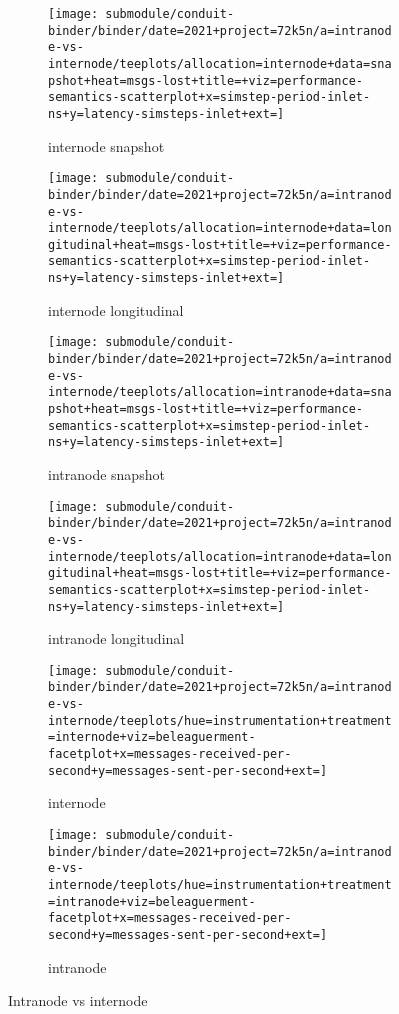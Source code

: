 \begin{figure*}[h]
    \centering
    \begin{subfigure}[b]{0.45\textwidth}
        \centering
        \texttt{[image: submodule/conduit-binder/binder/date=2021+project=72k5n/a=intranode-vs-internode/teeplots/allocation=internode+data=snapshot+heat=msgs-lost+title=+viz=performance-semantics-scatterplot+x=simstep-period-inlet-ns+y=latency-simsteps-inlet+ext=]}
        \caption{internode snapshot}
        \label{fig:TODO}
      \end{subfigure}%
      \begin{subfigure}[b]{0.45\textwidth}
      \centering
      \texttt{[image: submodule/conduit-binder/binder/date=2021+project=72k5n/a=intranode-vs-internode/teeplots/allocation=internode+data=longitudinal+heat=msgs-lost+title=+viz=performance-semantics-scatterplot+x=simstep-period-inlet-ns+y=latency-simsteps-inlet+ext=]}
      \caption{internode longitudinal}
      \label{fig:TODO}
    \end{subfigure}%

    \begin{subfigure}[b]{0.45\textwidth}
        \centering
        \texttt{[image: submodule/conduit-binder/binder/date=2021+project=72k5n/a=intranode-vs-internode/teeplots/allocation=intranode+data=snapshot+heat=msgs-lost+title=+viz=performance-semantics-scatterplot+x=simstep-period-inlet-ns+y=latency-simsteps-inlet+ext=]}
        \caption{intranode snapshot}
        \label{fig:TODO}
    \end{subfigure}%
    \begin{subfigure}[b]{0.45\textwidth}
      \centering
      \texttt{[image: submodule/conduit-binder/binder/date=2021+project=72k5n/a=intranode-vs-internode/teeplots/allocation=intranode+data=longitudinal+heat=msgs-lost+title=+viz=performance-semantics-scatterplot+x=simstep-period-inlet-ns+y=latency-simsteps-inlet+ext=]}
      \caption{intranode longitudinal}
      \label{fig:TODO}
    \end{subfigure}%

    \begin{subfigure}[b]{\textwidth}
      \centering
      \texttt{[image: submodule/conduit-binder/binder/date=2021+project=72k5n/a=intranode-vs-internode/teeplots/hue=instrumentation+treatment=internode+viz=beleaguerment-facetplot+x=messages-received-per-second+y=messages-sent-per-second+ext=]}
      \caption{internode}
      \label{fig:TODO}
    \end{subfigure}

    \begin{subfigure}[b]{\textwidth}
      \centering
      \texttt{[image: submodule/conduit-binder/binder/date=2021+project=72k5n/a=intranode-vs-internode/teeplots/hue=instrumentation+treatment=intranode+viz=beleaguerment-facetplot+x=messages-received-per-second+y=messages-sent-per-second+ext=]}
      \caption{intranode}
      \label{fig:TODO}
    \end{subfigure}

    \caption{Intranode vs internode}
    \label{fig:intranode-vs-internode-summary}
  \end{figure*}
